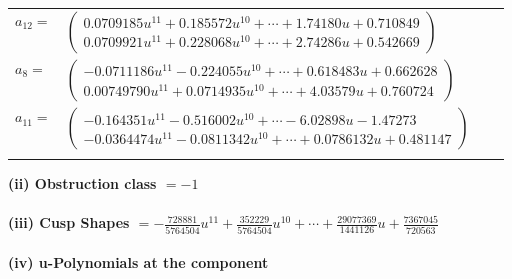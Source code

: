 \documentclass[1p]{elsarticle_modified}
\theoremstyle{definition}
\begin{document}
\begin{tabular}{m{7pt} m{180pt} m{7pt} m{180pt} }
\flushright $a_{12}=$&$\begin{pmatrix}0.0709185 u^{11}+0.185572 u^{10}+\cdots+1.74180 u+0.710849\\0.0709921 u^{11}+0.228068 u^{10}+\cdots+2.74286 u+0.542669\end{pmatrix}$ \\
\flushright $a_{8}=$&$\begin{pmatrix}-0.0711186 u^{11}-0.224055 u^{10}+\cdots+0.618483 u+0.662628\\0.00749790 u^{11}+0.0714935 u^{10}+\cdots+4.03579 u+0.760724\end{pmatrix}$ \\
\flushright $a_{11}=$&$\begin{pmatrix}-0.164351 u^{11}-0.516002 u^{10}+\cdots-6.02898 u-1.47273\\-0.0364474 u^{11}-0.0811342 u^{10}+\cdots+0.0786132 u+0.481147\end{pmatrix}$\\&\end{tabular}
\flushleft \textbf{(ii) Obstruction class $= -1$}\\~\\
\flushleft \textbf{(iii) Cusp Shapes $= -\frac{728881}{5764504} u^{11}+\frac{352229}{5764504} u^{10}+\cdots+\frac{29077369}{1441126} u+\frac{7367045}{720563}$}\\~\\
\newpage\renewcommand{\arraystretch}{1}
\flushleft \textbf{(iv) u-Polynomials at the component}\newline \\
\end{document}
